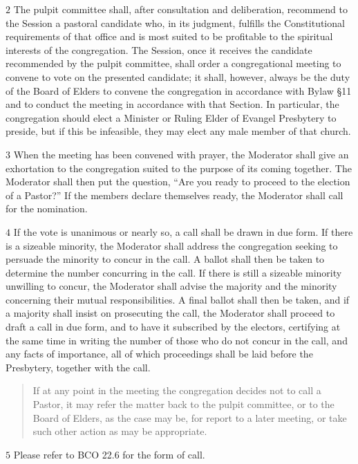 \documentclass[
]{book}
\begin{document}
\(2\) The pulpit committee shall, after consultation and deliberation, recommend to the Session a pastoral candidate who, in its judgment, fulfills the Constitutional requirements of that office and is most suited to be profitable to the spiritual interests of the congregation. The Session, once it receives the candidate recommended by the pulpit committee, shall order a congregational meeting to convene to vote on the presented candidate; it shall, however, always be the duty of the Board of Elders to convene the congregation in accordance with Bylaw §11 and to conduct the meeting in accordance with that Section. In particular, the congregation should elect a Minister or Ruling Elder of Evangel Presbytery to preside, but if this be infeasible, they may elect any male member of that church.

\(3\) When the meeting has been convened with prayer, the Moderator shall give an exhortation to the congregation suited to the purpose of its coming together. The Moderator shall then put the question, ``Are you ready to proceed to the election of a Pastor?'' If the members declare themselves ready, the Moderator shall call for the nomination.

\(4\) If the vote is unanimous or nearly so, a call shall be drawn in due form. If there is a sizeable minority, the Moderator shall address the congregation seeking to persuade the minority to concur in the call. A ballot shall then be taken to determine the number concurring in the call. If there is still a sizeable minority unwilling to concur, the Moderator shall advise the majority and the minority concerning their mutual responsibilities. A final ballot shall then be taken, and if a majority shall insist on prosecuting the call, the Moderator shall proceed to draft a call in due form, and to have it subscribed by the electors, certifying at the same time in writing the number of those who do not concur in the call, and any facts of importance, all of which proceedings shall be laid before the Presbytery, together with the call.

\begin{quote}
If at any point in the meeting the congregation decides not to call a Pastor, it may refer the matter back to the pulpit committee, or to the Board of Elders, as the case may be, for report to a later meeting, or take such other action as may be appropriate.
\end{quote}

\(5\) Please refer to BCO 22.6 for the form of call.
\end{document}
